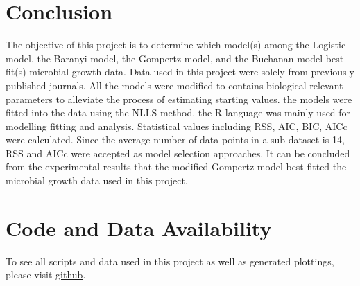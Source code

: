  \section{Conclusion}
The objective of this project is to determine which model(s) among the Logistic model, the Baranyi model, the Gompertz model, and the Buchanan model best fit(s) microbial growth data. Data used in this project were solely from previously published journals. All the models were modified to contains biological relevant parameters to alleviate the process of estimating starting values. the models were fitted into the data using the NLLS method. the R language was mainly used for modelling fitting and analysis. Statistical values including RSS, AIC, BIC, AICc were calculated. Since the average number of data points in a sub-dataset is 14, RSS and AICc were accepted as model selection approaches. It can be concluded from the experimental results that the modified Gompertz model best fitted the microbial growth data used in this project.

\section{Code and Data Availability}
To see all scripts and data used in this project as well as generated plottings, please visit \href{https://github.com/emersonff/CMEECourseWork.git}{github}.



